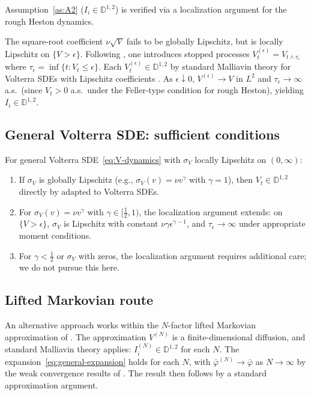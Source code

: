 \documentclass[12pt]{article}
\theoremstyle{definition}
\newcommand{\Dbb}{\mathbb{D}}
\begin{document}
Assumption~\ref{as:A2} ($I_i \in \Dbb^{1,2}$) is verified via a
localization argument for the rough Heston dynamics.

The square-root coefficient $\nu\sqrt{V}$ fails to be globally
Lipschitz, but is locally Lipschitz on $\{V > \epsilon\}$.
Following \citet{AlosLeonVives2007},
one introduces stopped processes
$V^{(\epsilon)}_t = V_{t\wedge\tau_\epsilon}$ where
$\tau_\epsilon = \inf\{t : V_t \le \epsilon\}$.
Each $V^{(\epsilon)}_t \in \Dbb^{1,2}$
by standard Malliavin theory for Volterra SDEs with Lipschitz
coefficients \citep{Nualart2006}.
As $\epsilon \downarrow 0$, $V^{(\epsilon)} \to V$ in $L^2$
and $\tau_\epsilon \to \infty$ a.s.\ (since $V_t > 0$ a.s.\ under
the Feller-type condition for rough Heston),
yielding $I_i \in \Dbb^{1,2}$.

\subsection{General Volterra SDE: sufficient conditions}

For general Volterra SDE~\eqref{eq:V-dynamics} with $\sigma_V$
locally Lipschitz on $(0,\infty)$:

\begin{enumerate}[label=(\roman*)]
\item If $\sigma_V$ is globally Lipschitz (e.g.,
  $\sigma_V(v) = \nu v^\gamma$ with $\gamma = 1$), then
  $V_t \in \Dbb^{1,2}$ directly by \citet[Theorem~2.2.1]{Nualart2006}
  adapted to Volterra SDEs.

\item For $\sigma_V(v) = \nu v^\gamma$ with
  $\gamma \in [\tfrac12, 1)$, the localization argument extends:
  on $\{V > \epsilon\}$, $\sigma_V$ is Lipschitz with constant
  $\nu\gamma\epsilon^{\gamma-1}$, and $\tau_\epsilon \to \infty$
  under appropriate moment conditions.

\item For $\gamma < \tfrac12$ or $\sigma_V$ with zeros, the
  localization argument requires additional care; we do not pursue
  this here.
\end{enumerate}

\subsection{Lifted Markovian route}

An alternative approach works within the $N$-factor lifted
Markovian approximation of \citet{AbiJaberElEuch2019}.
The approximation $V^{(N)}$ is a finite-dimensional diffusion,
and standard Malliavin theory applies: $I_i^{(N)} \in \Dbb^{1,2}$
for each $N$.
The expansion~\eqref{eq:general-expansion} holds for each $N$,
with $\bar\varphi^{(N)} \to \bar\varphi$ as $N \to \infty$
by the weak convergence results of \citet{RichardTanYang2023}.
The result then follows by a standard approximation argument.
\end{document}
